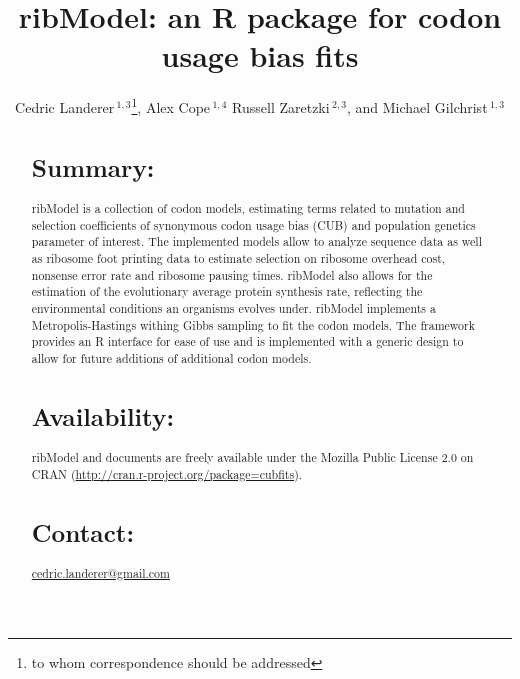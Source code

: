 \documentclass{bioinfo}
\newcommand{\pkg}[1]{{\fontseries{b}\selectfont #1}}
\let\proglang=\textsf
\newcommand{\package}{ribModel } %
\begin{document}

\title[ribModel]{ribModel: an \proglang{R} package for codon usage bias fits}
\author[
Landerer \textit{et~al}]{Cedric Landerer\,$^{1,3}$\footnote{
to whom correspondence should be addressed
},
Alex Cope\,$^{1,4}$
Russell Zaretzki\,$^{2,3}$, and
Michael Gilchrist\,$^{1,3}$
}
\address{$^{1}$
Department of Ecology and Evolutionary Biology,
$^{2}$Department of Statistics, Operations, and Management Science, and
$^{3}$National Institute for Mathematical and Biological Synthesis,
University of Tennessee, Knoxville, TN, USA,
$^{4}$Oak Ridge National Labratory, Oak Ridge, TN, USA} 


\maketitle

\begin{abstract}

\section{Summary:}
\pkg{\package} is a collection of codon models, estimating terms related to mutation and selection coefficients of synonymous codon usage bias (CUB) and population genetics parameter of interest. 
The implemented models allow to analyze sequence data as well as ribosome foot printing data to estimate selection on ribosome overhead cost, nonsense error rate and ribosome pausing times. 
\package also allows for the estimation of the evolutionary average protein synthesis rate, reflecting the environmental conditions an organisms evolves under. 
\package implements a Metropolis-Hastings withing Gibbs sampling to fit the codon models.
The framework provides an R interface for ease of use and is implemented with a generic design to allow for future additions of additional codon models.

\section{Availability:}
\pkg{\package} and documents are freely available under the Mozilla Public License 2.0
on CRAN (\url{http://cran.r-project.org/package=cubfits}).

\section{Contact:} \href{cedric.landerer@gmail.com}{cedric.landerer@gmail.com}
\end{abstract}
\end{document}
